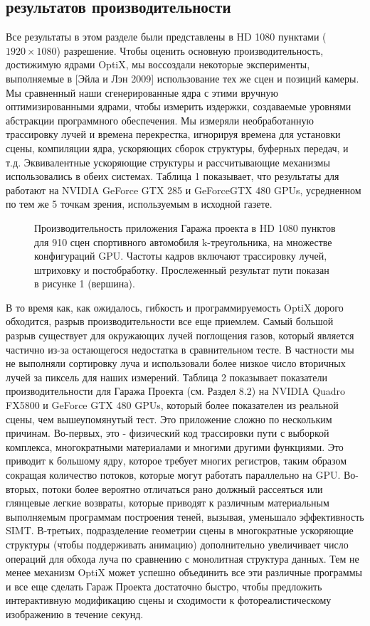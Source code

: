 \subsection{результатов производительности}
Все результаты в этом разделе были представлены в HD 1080 пунктами ($1920\times1080$) разрешение. Чтобы оценить основную производительность, достижимую ядрами OptiX, мы воссоздали некоторые эксперименты, выполняемые в [Эйла и Лэн 2009] использование тех же сцен и позиций камеры. Мы сравненный наши сгенерированные ядра с этими вручную оптимизированными ядрами, чтобы измерить издержки, создаваемые уровнями абстракции программного обеспечения. Мы измеряли необработанную трассировку лучей и времена перекрестка, игнорируя времена для установки сцены, компиляции ядра, ускоряющих сборок структуры, буферных передач, и т.д. Эквивалентные ускоряющие структуры и рассчитывающие механизмы использовались в обеих системах. Таблица 1 показывает, что результаты для работают на NVIDIA GeForce GTX 285 и GeForceGTX 480 GPUs, усредненном по тем же 5 точкам зрения, используемым в исходной газете.
\begin{figure}[h!]
\caption{Производительность приложения Гаража проекта в HD 1080 пунктов для 910 сцен спортивного автомобиля k-треугольника, на множестве конфигураций GPU. Частоты кадров включают трассировку лучей, штриховку и постобработку. Прослеженный результат пути показан в рисунке 1 (вершина).}
\label{fig8}
\end{figure}
  В то время как, как ожидалось, гибкость и программируемость OptiX дорого обходится, разрыв производительности все еще приемлем. Самый большой разрыв существует для окружающих лучей поглощения газов, который является частично
из-за остающегося недостатка в сравнительном тесте. В частности мы не выполняли сортировку луча и использовали более низкое число вторичных лучей за пиксель для наших измерений.
Таблица 2 показывает показатели производительности для Гаража Проекта (см. Раздел 8.2) на NVIDIA Quadro FX5800 и GeForce GTX 480 GPUs, который более показателен из реальной сцены, чем вышеупомянутый тест. Это приложение сложно по нескольким причинам. Во-первых, это - физический код трассировки пути с выборкой комплекса, многократными материалами и многими другими функциями. Это приводит к большому ядру, которое требует многих регистров, таким образом сокращая количество потоков, которые могут работать параллельно на GPU. Во-вторых, потоки более вероятно отличаться рано должный рассеяться или глянцевые легкие возвраты, которые приводят к различным материальным выполняемым программам построения теней, вызывая, уменьшало эффективность SIMT. В-третьих, подразделение геометрии сцены в многократные ускоряющие структуры (чтобы поддерживать анимацию) дополнительно увеличивает число операций для обхода луча по сравнению с монолитная структура данных. Тем не менее механизм OptiX может успешно объединить все эти различные программы и все еще сделать Гараж Проекта достаточно быстро, чтобы предложить интерактивную модификацию сцены и сходимости к фотореалистическому изображению в течение секунд.

